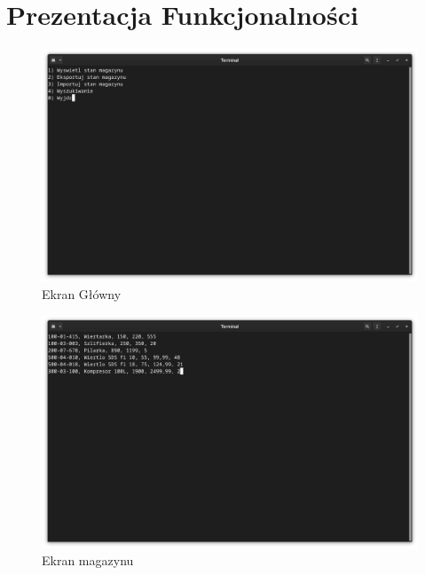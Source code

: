 \documentclass[12pt,a4paper]{article}
\begin{document}
\section{Prezentacja Funkcjonalności}
\begin{figure}[hp]
\centering

\includegraphics[scale=.30]{figures/ekran_glowny.png}

\caption{Ekran Główny}
\end{figure}

\begin{figure}[hp]
\centering

\includegraphics[scale=.30]{figures/ekran_magazynu.png}

\caption{Ekran magazynu}
\end{figure}
\end{document}
